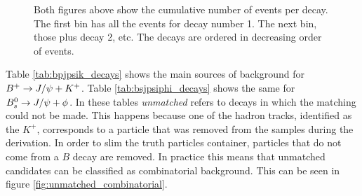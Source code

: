 \begin{figure}[ht]
    \centering

    \caption{\scriptsize Both figures above show the cumulative number of events per decay. The first bin
	has all the events for decay number 1. The next bin, those plus decay 2, etc. The decays are ordered
    in decreasing order of events.}
    \label{fig:decay_multiplicity}
\end{figure}

Table \ref{tab:bpjpsik_decays} shows the main sources of background for $B^{+}\rightarrow J/\psi+K^{+}$.
Table \ref{tab:bsjpsiphi_decays} shows the same for $B_{s}^{0}\rightarrow J/\psi + \phi$. In these tables
\textit{unmatched} refers to decays in which the matching could not be made. This
happens because one of the hadron tracks, identified as the $K^+$, corresponds to
a particle that was removed from the samples during the derivation. In order to 
slim the truth particles container, particles that do not come from a $B$ decay
are removed. In practice this means that unmatched candidates can be classified
as combinatorial background. This can be seen in figure \ref{fig:unmatched_combinatorial}.

